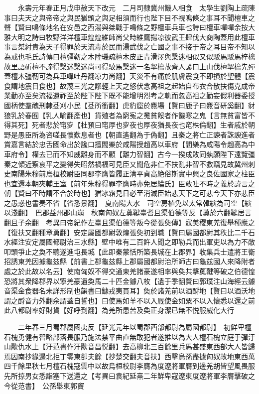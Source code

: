 　　永壽元年春正月戊申赦天下改元　二月司隸冀州饑人相食　太學生劉陶上疏陳事曰夫天之與帝帝之與民猶頭之與足相須而行也陛下目不視鳴條之事耳不聞檀車之聲【賢曰鳴條地名在安邑之西湯與桀戰于鳴條之野檀車兵車也詩曰檀車嘽嘽余按大雅大明之詩曰牧野洋洋檀車煌煌維師尚父時維鷹揚凉彼武王肆伐大商陶蓋用此檀車事言桀紂貴為天子得罪於天流毒於民而湯武伐之亡國之事不接于帝之耳目帝不知以為戒也毛氏詩傳曰檀彊靭之木陸璣疏檀木皮正青滑澤與檕迷相似又似駁馬駁馬梓檎故里語斫檀不諦得檕迷檕迷尚可得駮馬檕迷一名挈橀故齊人諺曰上山伐檀挈橀先殫蓋檀木彊靭可為兵車嘽吐丹翻凉力尚翻】天災不有痛於肌膚震食不即損於聖體【震食謂地震日食也】故蔑三光之謬輕上天之怒伏念高祖之起始自布衣合散扶傷克成帝業勤亦至矣流福遺祚至於陛下陛下既不能增明烈考之軌而忽高祖之勤妄假利器委授國柄使羣醜刑隸芟刈小民【芟所銜翻】虎豹窟於麑場【賢曰鹿子曰麑音研奚翻】豺狼乳於春囿【乳人喻翻產也】貨殖者為窮寃之䰟貧餒者作饑寒之鬼【言無貧富皆不得其死】死者悲於窀穸【杜預曰窀厚也穸夜也厚夜猶長夜也窀株倫翻】生者戚於朝野是愚臣所為咨嗟長懷歎息者也【朝直遙翻為于偽翻】且秦之將亡正諫者誅諛進者賞嘉言結於忠舌國命出於讒口擅閻樂於咸陽授趙高以車府【閻樂為咸陽令趙高為中車府令】權去已而不知威離身而不顧【離力智翻】古今一揆成敗同埶願陛下遠覽彊秦之傾近察哀平之變得失昭然禍福可見臣又聞危非仁不扶亂非智不救竊見故冀州刺史南陽朱穆前烏桓校尉臣同郡李膺皆履正清平貞高絶俗斯實中興之良佐國家之柱臣也宜還本朝夾輔王室【前年朱穆得罪李膺時亦免居綸氏】臣敢吐不時之義於諱言之朝【賢曰不時謂不合於時也】猶冰霜見日必至消滅臣始悲天下之可悲今天下亦悲臣之愚惑也書奏不省【省悉景翻】　夏南陽大水　司空房植免以太常韓縯為司空【縯以淺翻】　巴郡益州郡山崩　秋南匈奴左薁鞬臺耆且渠伯德等反【薁於六翻鞬居言翻且子余翻　考異曰帝紀作左臺且渠伯德等叛今從張奐傳】寇美稷東羌復舉種應之【復扶又翻種章勇翻】安定屬國都尉敦煌張奐初到職【賢曰屬國都尉其秩比二千石水經注安定屬國都尉治三水縣】壁中唯有二百許人聞之即勒兵而出軍吏以為力不敵叩頭爭止之奐不聽遂進屯長城【此即秦蒙恬所築長城在上郡界】收集兵士遣將王衛招誘東羌因據龜兹縣【前書上郡龜兹縣上郡屬國都尉治所師古曰龜兹國人來降附者處之於此故以名云】使南匈奴不得交通東羌諸豪遂相率與奐共擊薁鞬等破之伯德惶恐將其衆降郡界以寧羌豪遺奐馬二十匹金鐻八枚【遺于季翻賢曰郭璞注山海經云鐻音渠金食器名未詳形制也韻書曰鐻戎夷貫耳】奐於諸羌前以酒酹地【賢曰以酒沃地謂之酹音力外翻余謂蓋自誓也】曰使馬如羊不以入厩使金如粟不以入懷悉以還之前此八都尉率好財貨【好呼到翻】為羌所患苦及奐正身潔已無不悦服威化大行

　　二年春三月蜀郡屬國夷反【延光元年以蜀郡西部都尉為屬國都尉】　初鮮卑檀石槐勇健有智略部落畏服乃施法禁平曲直無敢犯者遂推以為大人檀石槐立庭于彈汙山歠仇水上【汙范書作汗歠音昌悦翻】去高柳北三百餘里兵馬甚盛東西部大人皆歸焉因南抄緣邊北拒丁零東卻夫餘【抄楚交翻夫音扶】西擊烏孫盡據匈奴故地東西萬四千餘里秋七月檀石槐寇雲中以故烏桓校尉李膺為度遼將軍膺到邊羌胡皆望風畏服先所掠男女悉詣塞下送還之【考異曰袁紀延熹二年鮮卑寇遼東度遼將軍李膺擊破之今從范書】　公孫舉東郭竇

